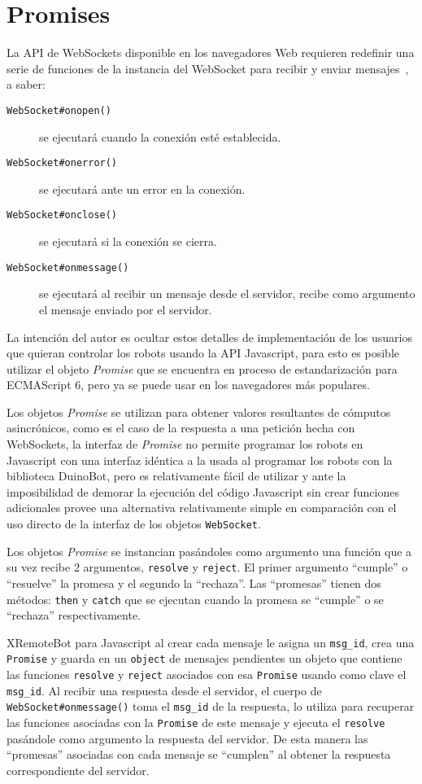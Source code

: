 \section{Promises}

La API de WebSockets disponible en los navegadores Web requieren
redefinir una serie de funciones de la instancia del WebSocket
para recibir y enviar mensajes~\citep{websocket_2014}, a saber:
\begin{description}
    \item[\texttt{WebSocket\#onopen()}] se ejecutará cuando
    la conexión esté establecida.
    \item[\texttt{WebSocket\#onerror()}] se ejecutará ante un error en
    la conexión.
    \item[\texttt{WebSocket\#onclose()}] se ejecutará si la conexión
    se cierra.
    \item[\texttt{WebSocket\#onmessage()}] se ejecutará al recibir un
    mensaje desde el servidor, recibe como argumento el mensaje
    enviado por el servidor.
\end{description}

La intención del autor es ocultar estos detalles de implementación de
los usuarios que quieran controlar los robots usando la API Javascript,
para esto es posible utilizar el objeto \textit{Promise} que se encuentra
en proceso de estandarización para ECMAScript 6, pero ya se puede
usar en los navegadores más populares.

Los objetos \textit{Promise} se utilizan para obtener valores resultantes
de cómputos asincrónicos, como es el caso de la respuesta a una petición
hecha con WebSockets, la interfaz de \textit{Promise} no permite programar
los robots en Javascript con una interfaz idéntica a la usada al programar
los robots con la biblioteca DuinoBot, pero es relativamente fácil de
utilizar y ante la imposibilidad de demorar la ejecución del código
Javascript sin crear funciones adicionales provee una alternativa
relativamente simple en comparación con el uso directo de la interfaz
de los objetos \texttt{WebSocket}.

Los objetos \textit{Promise} se instancian pasándoles como argumento una
función que a su vez recibe 2 argumentos, \texttt{resolve} y \texttt{reject}.
El primer argumento ``cumple'' o ``resuelve'' la promesa y el segundo la
``rechaza''.
Las ``promesas'' tienen dos métodos: \texttt{then} y \texttt{catch} que se
ejecutan cuando la promesa se ``cumple'' o se ``rechaza'' respectivamente.

XRemoteBot para Javascript al crear cada mensaje le asigna un \texttt{msg\_id},
crea una \texttt{Promise} y guarda en un \texttt{object} de mensajes
pendientes un objeto que contiene las funciones \texttt{resolve} y
\texttt{reject} asociados con esa \texttt{Promise}
usando como clave el \texttt{msg\_id}. Al recibir una respuesta
desde el servidor, el cuerpo de \texttt{WebSocket\#onmessage()} toma el
\texttt{msg\_id} de la respuesta, lo utiliza para recuperar las funciones
asociadas con la \texttt{Promise} de este mensaje y ejecuta el
\texttt{resolve} pasándole como argumento la respuesta del servidor.
De esta manera las ``promesas'' asociadas con cada
mensaje se ``cumplen'' al obtener la respuesta correspondiente del servidor.

